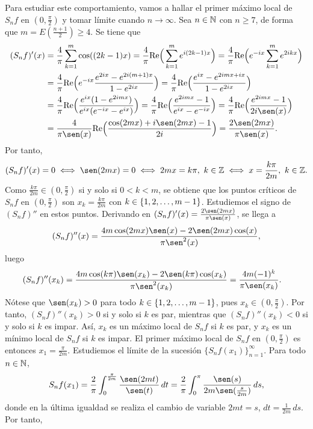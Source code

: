 \documentclass[a4paper, 12pt, oneside]{book}
\begin{document}
Para estudiar este comportamiento, vamos a hallar el primer máximo local de $S_nf$ en $(0,\frac{\pi}{2})$ y tomar límite cuando $n \to \infty$. Sea $n \in \mathbb N$ con $n \geq 7$, de forma que $m = E(\frac{n+1}{2}) \geq 4$. Se tiene que
\begin{align*}
    (S_nf)'(x) &= \frac{4}{\pi}\sum_{k=1}^m \cos((2k-1)x) = \frac{4}{\pi}\real\Bigl(\,\sum_{k=1}^m e^{i(2k-1)x}\Bigr) = \frac{4}{\pi}\real\Bigl(e^{-ix}\sum_{k=1}^m e^{2ikx}\Bigr) \\
    &= \frac{4}{\pi}\real\Bigl(e^{-ix}\frac{e^{2ix}-e^{2i(m+1)x}}{1-e^{2ix}}\Bigr) = \frac{4}{\pi}\real\Bigl(\frac{e^{ix}-e^{2imx+ix}}{1-e^{2ix}}\Bigr) \\ 
    &= \frac{4}{\pi}\real\Bigl(\frac{e^{ix}(1-e^{2imx})}{e^{ix}(e^{-ix}-e^{ix})}\Bigr) = \frac{4}{\pi}\real\Bigl(\frac{e^{2imx}-1}{e^{ix}-e^{-ix}}\Bigr) = \frac{4}{\pi}\real\Bigl(\frac{e^{2imx}-1}{2i\sen(x)}\Bigr) \\
    &= \frac{4}{\pi\sen(x)}\real\Bigl(\frac{\cos(2mx)+i\sen(2mx)-1}{2i}\Bigr) =  \frac{2\sen(2mx)}{\pi\sen(x)}.\\
\end{align*}
Por tanto,
\[(S_nf)'(x) = 0 \iff \sen(2mx) = 0 \iff 2mx = k\pi, \ k \in \Z \iff x = \frac{k\pi}{2m}, \ k \in \Z.\]
Como $\frac{k\pi}{2m}\in (0,\frac{\pi}{2})$ si y solo si $0 < k < m$, se obtiene que los puntos críticos de $S_nf$ en $(0,\frac{\pi}{2})$ son $x_k = \frac{k\pi}{2m}$ con $k \in \{1,2,\mathellipsis,m-1\}$. Estudiemos el signo de $(S_nf)''$ en estos puntos. Derivando en $(S_nf)'(x) = \frac{2\sen(2mx)}{\pi\sen(x)}$, se llega a
\[(S_nf)''(x) = \frac{4m\cos(2mx)\sen(x)-2\sen(2mx)\cos(x)}{\pi\sen^2(x)},\]
luego
\begin{align*}
    (S_nf)''(x_k) &= \frac{4m\cos(k\pi)\sen(x_k)-2\sen(k\pi)\cos(x_k)}{\pi\sen^2(x_k)} = \frac{4m(-1)^k}{\pi\sen(x_k)}.
\end{align*}
Nótese que $\sen(x_k) > 0$ para todo $k \in \{1,2,\mathellipsis,m-1\}$, pues $x_k \in (0,\frac{\pi}{2})$. Por tanto, $(S_nf)''(x_k) > 0$ si y solo si $k$ es par, mientras que $(S_nf)''(x_k) < 0$ si y solo si $k$ es impar. Así, $x_k$ es un máximo local de $S_nf$ si $k$ es par, y $x_k$ es un mínimo local de $S_nf$ si $k$ es impar. El primer máximo local de $S_nf$ en $(0,\frac{\pi}{2})$ es entonces $x_1 = \frac{\pi}{2m}$. Estudiemos el límite de la sucesión $\{S_nf(x_1)\}_{n=1}^\infty$. Para todo $n \in \mathbb N$,
\[S_nf(x_1) = \frac{2}{\pi}\integral{0}{\frac{\pi}{2m}}{\frac{\sen(2mt)}{\sen(t)}} = \frac{2}{\pi}\integral[s]{0}{\pi}{\frac{\sen(s)}{2m\sen(\frac{s}{2m})}},\]
donde en la última igualdad se realiza el cambio de variable $2mt = s$, $dt = \frac{1}{2m}\, ds$. Por tanto,
\end{document}
